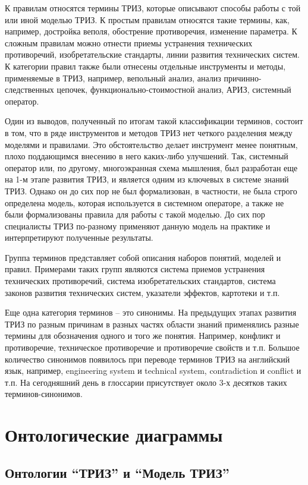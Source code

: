 \documentclass[11pt,a4paper]{article}
\begin{document}
К правилам относятся термины ТРИЗ, которые описывают способы работы с той или
иной моделью ТРИЗ. К простым правилам относятся такие термины, как, например,
достройка веполя, обострение противоречия, изменение параметра. К сложным
правилам можно отнести приемы устранения технических противоречий,
изобретательские стандарты, линии развития технических систем. К категории
правил также были отнесены отдельные инструменты и методы, применяемые в ТРИЗ,
например, вепольный анализ, анализ причинно-следственных цепочек,
функционально-стоимостной анализ, АРИЗ, системный оператор.

Один из выводов, полученный по итогам такой классификации терминов, состоит в
том, что в ряде инструментов и методов ТРИЗ нет четкого разделения между
моделями и правилами. Это обстоятельство делает инструмент менее понятным,
плохо поддающимся внесению в него каких-либо улучшений. Так, системный
оператор или, по другому, многоэкранная схема мышления, был разработан еще на
1-м этапе развития ТРИЗ, и является одним из ключевых в системе знаний ТРИЗ.
Однако он до сих пор не был формализован, в частности, не была строго
определена модель, которая используется в системном операторе, а также не были
формализованы правила для работы с такой моделью. До сих пор специалисты ТРИЗ
по-разному применяют данную модель на практике и интерпретируют полученные
результаты.

Группа терминов представляет собой описания наборов понятий, моделей и правил.
Примерами таких групп являются система приемов устранения технических
противоречий, система изобретательских стандартов, система законов развития
технических систем, указатели эффектов, картотеки и т.п.

Еще одна категория терминов -- это синонимы. На предыдущих этапах развития
ТРИЗ по разным причинам в разных частях области знаний применялись разные
термины для обозначения одного и того же понятия. Например, конфликт и
противоречие, техническое противоречие и противоречие свойств и т.п. Большое
количество синонимов появилось при переводе терминов ТРИЗ на английский язык,
например, engineering system и technical system, contradiction и conflict и
т.п. На сегодняшний день в глоссарии присутствует около 3-х десятков таких
терминов-синонимов.

\section{Онтологические диаграммы}

\subsection{Онтологии “ТРИЗ” и “Модель ТРИЗ”}
\end{document}
